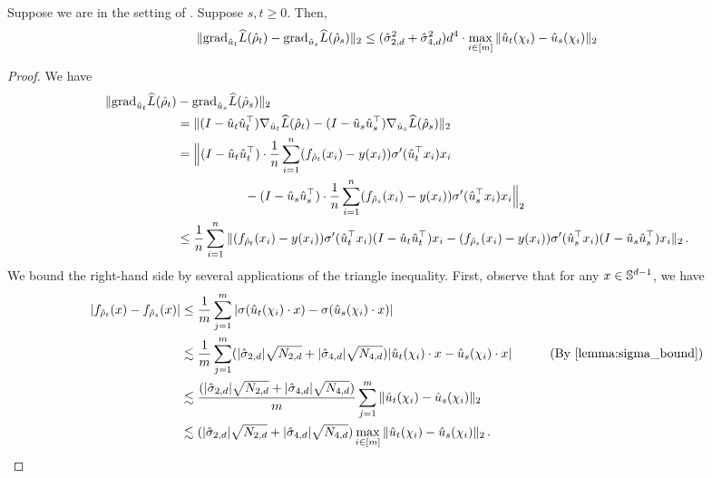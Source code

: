 \begin{lemma} \label{lemma:hat_grad_diff}
Suppose we are in the setting of . Suppose $s, t \geq 0$. Then,
\begin{align}
\|{\textup{grad}}_{\hat{u}_t} \widehat{L}({\hat{\rho}}_t) - {\textup{grad}}_{\hat{u}_s} \widehat{L}({\hat{\rho}}_s)\|_2 \leq (\hat{\sigma}_{2, d}^2 + \hat{\sigma}_{4, d}^2) d^4 \cdot \max_{i \in [m]} \|\hat{u}_t(\chi_i) - \hat{u}_s(\chi_i)\|_2
\end{align}
\end{lemma}
\begin{proof}
We have
\begin{align}
\|{\textup{grad}}_{\hat{u}_t}\widehat{L}({\hat{\rho}}_t) & - {\textup{grad}}_{\hat{u}_s} \widehat{L}({\hat{\rho}}_s)\|_2 \\
& = \| (I - \hat{u}_t \hat{u}_t^\top) \nabla_{\hat{u}_t} \widehat{L}({\hat{\rho}}_t) - (I - \hat{u}_s \hat{u}_s^\top) \nabla_{\hat{u}_s} \widehat{L}({\hat{\rho}}_s) \|_2 \\
& = \Big\|(I - \hat{u}_t \hat{u}_t^\top) \cdot \frac{1}{n} \sum_{i = 1}^n (f_{{\hat{\rho}}_t}(x_i) - y(x_i)) \sigma'(\hat{u}_t^\top x_i) x_i \\
& \,\,\,\,\,\,\,\,\,\,\,\,\,\,\,\,\,\,\,\,\,\,\,\,\,\,\,\,\,\,\,\, - (I - \hat{u}_s \hat{u}_s^\top) \cdot \frac{1}{n} \sum_{i = 1}^n (f_{{\hat{\rho}}_s}(x_i) - y(x_i)) \sigma'(\hat{u}_s^\top x_i) x_i \Big\|_2 \\
& \leq \frac{1}{n} \sum_{i = 1}^n \|(f_{{\hat{\rho}}_t}(x_i) - y(x_i)) \sigma'(\hat{u}_t^\top x_i) (I - \hat{u}_t \hat{u}_t^\top) x_i - (f_{{\hat{\rho}}_s}(x_i) - y(x_i)) \sigma'(\hat{u}_s^\top x_i) (I - \hat{u}_s \hat{u}_s^\top) x_i \|_2 \,. \label{eq:gradient_diff_1}
\end{align}
We bound the right-hand side by several applications of the triangle inequality. First, observe that for any $x \in \mathbb{S}^{d - 1}$, we have
\begin{align}
|f_{\rhohat_t}(x) - f_{\rhohat_s}(x)|
& \leq \frac{1}{m} \sum_{j = 1}^m |\sigma(\uhat_t(\chi_i) \cdot x) - \sigma(\uhat_s(\chi_i) \cdot x)| \\
& \lesssim \frac{1}{m} \sum_{j = 1}^m (|\sigmaCoeffTwo| \sqrt{N_{2, d}} + |\sigmaCoeffFour| \sqrt{N_{4, d}}) |\uhat_t(\chi_i) \cdot x - \uhat_s(\chi_i) \cdot x| 
& \tag{By \Cref{lemma:sigma_bound}} \\
& \lesssim \frac{(|\sigmaCoeffTwo| \sqrt{N_{2, d}} + |\sigmaCoeffFour| \sqrt{N_{4, d}})}{m} \sum_{j = 1}^m \|\uhat_t(\chi_i) - \uhat_s(\chi_i)\|_2 \\
& \lesssim (|\sigmaCoeffTwo| \sqrt{N_{2, d}} + |\sigmaCoeffFour| \sqrt{N_{4, d}}) \max_{i \in [m]} \|\uhat_t(\chi_i) - \uhat_s(\chi_i)\|_2 \period \label{eq:triangle_ineq_comp_1}

\end{align}
\end{proof}
